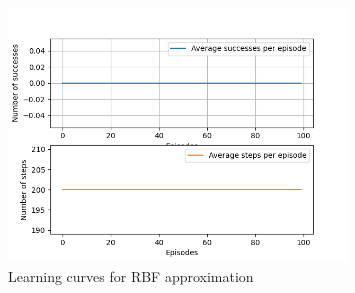 \documentclass{article}
\begin{document}
\begin{figure}[H]
\centering
\includegraphics[width=0.8\textwidth]{images/document/repeated_training_investigation_rbf.png}
\caption{Learning curves for RBF approximation}
\label{fig:rbf}
\end{figure}
\end{document}
